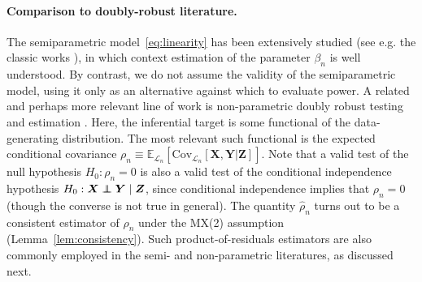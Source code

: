 \documentclass[12pt]{article}
\theoremstyle{definition}
\theoremstyle{remark}
\def\independenT#1#2{\mathrel{\rlap{$#1#2$}\mkern2mu{#1#2}}}
\newcommand\independent{\protect\mathpalette{\protect\independenT}{\perp}}
\newcommand{\prx}{\bm X}
\newcommand{\prz}{\bm Z}
\newcommand{\pry}{{\bm Y}}
\begin{document}

\paragraph{Comparison to doubly-robust literature.}

The semiparametric model~\eqref{eq:linearity} has been extensively studied (see e.g. the classic works \cite{Robinson1988, Robins1992}), in which context estimation of the parameter $\beta_n$ is well understood. By contrast, we do not assume the validity of the semiparametric model, using it only as an alternative against which to evaluate power. A related and perhaps more relevant line of work is non-parametric doubly robust testing \cite{Shah2018, Dukes2020}  and estimation \cite{VanderLaan2011, Chernozhukov2018}. Here, the inferential target is some functional of the data-generating distribution. The most relevant such functional is the expected conditional covariance $\rho_n \equiv \mathbb E_{\mathcal L_n}[\text{Cov}_{\mathcal L_n}[\prx, \pry|\prz]]$. Note that a valid test of the null hypothesis $H_0: \rho_n = 0$ is also a valid test of the conditional independence hypothesis $H_0: \prx \independent \pry \mid \prz$, since conditional independence implies that $\rho_n = 0$ (though the converse is not true in general). The quantity $\widehat \rho_n$ turns out to be a consistent estimator of $\rho_n$ under the MX(2) assumption (Lemma~\ref{lem:consistency}). Such product-of-residuals estimators are also commonly employed in the semi- and non-parametric literatures, as discussed next.
\end{document}
